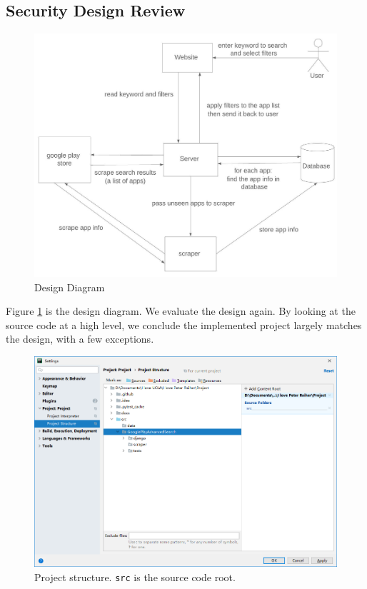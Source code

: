 \documentclass[12pt, a4paper]{article}
\newcommand{\code}[1]{\texttt{#1}}
\begin{document}
\subsection{Security Design Review}
\begin{figure}[ht]
\centering
\includegraphics[width=\textwidth]{Context_Diagram.jpeg}
\caption{Design Diagram}
\label{fig:design_diagram}
\end{figure}

Figure \ref{fig:design_diagram} is the design diagram. We evaluate the design again. By looking at the source code at a high level, we conclude the implemented project largely matches the design, with a few exceptions.

\begin{figure}[ht]
\centering
\includegraphics[width=\textwidth]{project-structure.png}
\caption{Project structure. \code{src} is the source code root.}
\label{fig:project-structure}
\end{figure}
\end{document}
